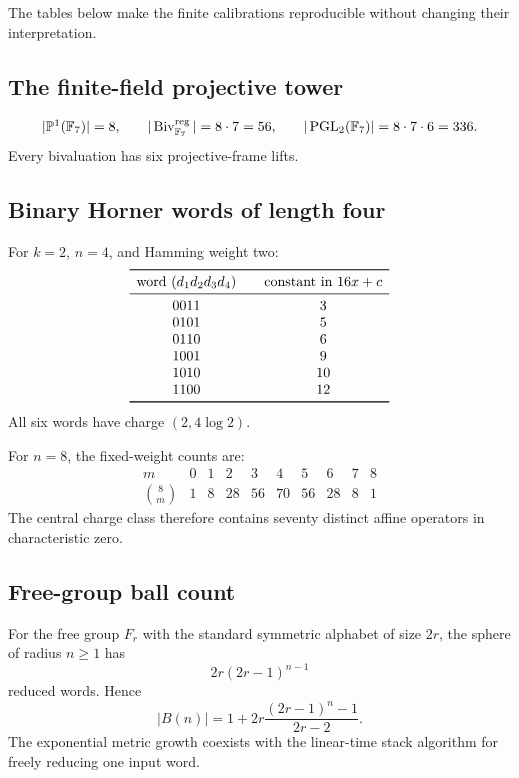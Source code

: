 The tables below make the finite calibrations reproducible without changing
their interpretation.

\subsection{The finite-field projective tower}

\[
\begin{array}{c@{\qquad}c@{\qquad}c}
|\PP^1(\F_7)|=8,
&|\Biv_{\F_7}^{\mathrm{reg}}|=8\cdot7=56,
&|\PGL_2(\F_7)|=8\cdot7\cdot6=336.
\end{array}
\]
Every bivaluation has six projective-frame lifts.

\subsection{Binary Horner words of length four}

For $k=2$, $n=4$, and Hamming weight two:
\[
\begin{array}{c@{\qquad}c}
\toprule
\text{word }(d_1d_2d_3d_4) & \text{constant in }16x+c\\
\midrule
0011&3\\
0101&5\\
0110&6\\
1001&9\\
1010&10\\
1100&12\\
\bottomrule
\end{array}
\]
All six words have charge $(2,4\log2)$.

For $n=8$, the fixed-weight counts are:
\[
\begin{array}{c|rrrrrrrrr}
m&0&1&2&3&4&5&6&7&8\\
\hline
\binom{8}{m}&1&8&28&56&70&56&28&8&1
\end{array}
\]
The central charge class therefore contains seventy distinct affine operators
in characteristic zero.

\subsection{Free-group ball count}

For the free group $F_r$ with the standard symmetric alphabet of size $2r$,
the sphere of radius $n\ge1$ has
\[
  2r(2r-1)^{n-1}
\]
reduced words.  Hence
\[
  |B(n)|
  =1+2r\frac{(2r-1)^n-1}{2r-2}.
\]
The exponential metric growth coexists with the linear-time stack algorithm
for freely reducing one input word.

